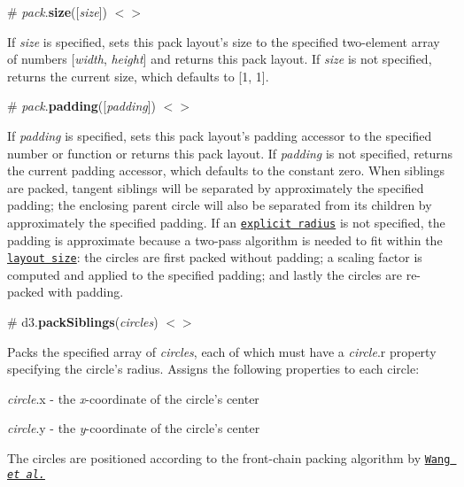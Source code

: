 \label{_pack_size}%
\# {\itshape pack}.{\bfseries size}(\mbox{[}{\itshape size}\mbox{]}) \href{https://github.com/d3/d3-hierarchy/blob/master/src/pack/index.js#L34}{\tt $<$$>$}

If {\itshape size} is specified, sets this pack layout’s size to the specified two-\/element array of numbers \mbox{[}{\itshape width}, {\itshape height}\mbox{]} and returns this pack layout. If {\itshape size} is not specified, returns the current size, which defaults to \mbox{[}1, 1\mbox{]}.

\label{_pack_padding}%
\# {\itshape pack}.{\bfseries padding}(\mbox{[}{\itshape padding}\mbox{]}) \href{https://github.com/d3/d3-hierarchy/blob/master/src/pack/index.js#L38}{\tt $<$$>$}

If {\itshape padding} is specified, sets this pack layout’s padding accessor to the specified number or function or returns this pack layout. If {\itshape padding} is not specified, returns the current padding accessor, which defaults to the constant zero. When siblings are packed, tangent siblings will be separated by approximately the specified padding; the enclosing parent circle will also be separated from its children by approximately the specified padding. If an \href{#pack_radius}{\tt explicit radius} is not specified, the padding is approximate because a two-\/pass algorithm is needed to fit within the \href{#pack_size}{\tt layout size}\+: the circles are first packed without padding; a scaling factor is computed and applied to the specified padding; and lastly the circles are re-\/packed with padding.

\label{_packSiblings}%
\# d3.{\bfseries pack\+Siblings}({\itshape circles}) \href{https://github.com/d3/d3-hierarchy/blob/master/src/pack/siblings.js}{\tt $<$$>$}

Packs the specified array of {\itshape circles}, each of which must have a {\itshape circle}.r property specifying the circle’s radius. Assigns the following properties to each circle\+:


\begin{DoxyItemize}
\item {\itshape circle}.x -\/ the {\itshape x}-\/coordinate of the circle’s center
\item {\itshape circle}.y -\/ the {\itshape y}-\/coordinate of the circle’s center
\end{DoxyItemize}

The circles are positioned according to the front-\/chain packing algorithm by \href{https://dl.acm.org/citation.cfm?id=1124851}{\tt Wang {\itshape et al.}}

